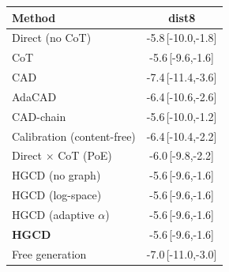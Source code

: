 \begin{tabular}{lc}
\toprule
Method & dist8 \\
\midrule
Direct (no CoT) & -5.8\,{\scriptsize[-10.0,-1.8]} \\
CoT & -5.6\,{\scriptsize[-9.6,-1.6]} \\
CAD & -7.4\,{\scriptsize[-11.4,-3.6]} \\
AdaCAD & -6.4\,{\scriptsize[-10.6,-2.6]} \\
CAD-chain & -5.6\,{\scriptsize[-10.0,-1.2]} \\
Calibration (content-free) & -6.4\,{\scriptsize[-10.4,-2.2]} \\
Direct $\times$ CoT (PoE) & -6.0\,{\scriptsize[-9.8,-2.2]} \\
HGCD (no graph) & -5.6\,{\scriptsize[-9.6,-1.6]} \\
HGCD (log-space) & -5.6\,{\scriptsize[-9.6,-1.6]} \\
HGCD (adaptive $\alpha$) & -5.6\,{\scriptsize[-9.6,-1.6]} \\
\textbf{HGCD} & -5.6\,{\scriptsize[-9.6,-1.6]} \\
Free generation & -7.0\,{\scriptsize[-11.0,-3.0]} \\
\bottomrule
\end{tabular}
